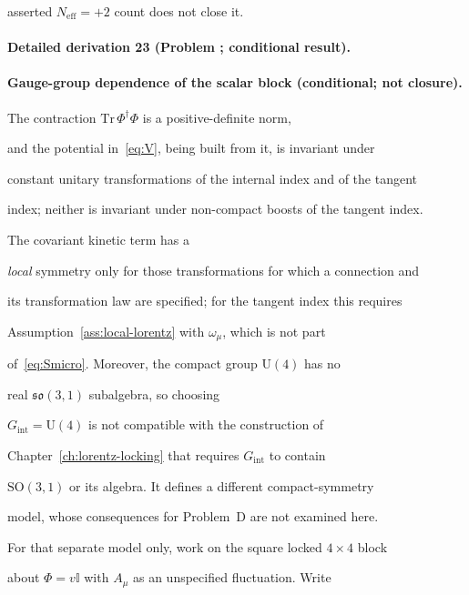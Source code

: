 asserted \(N_{\mathrm{eff}}=+2\) count does not close it.



\paragraph{Detailed derivation 23 (Problem ; conditional result).} \label{ref:detail-22} %



\paragraph{Gauge-group dependence of the scalar block (conditional; not closure).}

The contraction \(\mathrm{Tr}\,\Phi^\dagger\Phi\) is a positive-definite norm,

and the potential in~\eqref{eq:V}, being built from it, is invariant under

constant unitary transformations of the internal index and of the tangent

index; neither is invariant under non-compact boosts of the tangent index.

The covariant kinetic term has a

\emph{local} symmetry only for those transformations for which a connection and

its transformation law are specified; for the tangent index this requires

Assumption~\ref{ass:local-lorentz} with \(\omega_\mu\), which is not part

of~\eqref{eq:Smicro}. Moreover, the compact group \(\mathrm{U}(4)\) has no

real \(\mathfrak{so}(3,1)\) subalgebra, so choosing

\(G_{\mathrm{int}}=\mathrm{U}(4)\) is not compatible with the construction of

Chapter~\ref{ch:lorentz-locking} that requires \(G_{\mathrm{int}}\) to contain

\(\mathrm{SO}(3,1)\) or its algebra. It defines a different compact-symmetry

model, whose consequences for Problem~D are not examined here.



For that separate model only, work on the square locked \(4\times4\) block

about \(\Phi=v\mathbb{I}\) with \(A_\mu\) as an unspecified fluctuation. Write

